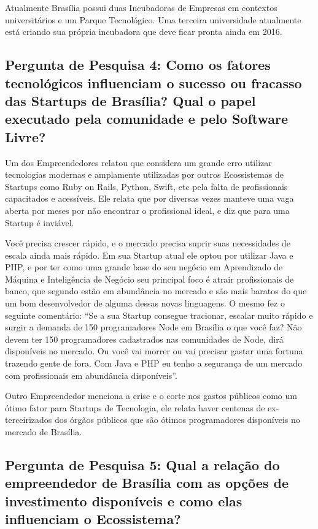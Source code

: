 Atualmente Brasília possui duas Incubadoras de Empresas em contextos universitários e um Parque Tecnológico. Uma terceira universidade atualmente está criando sua própria incubadora que deve ficar pronta ainda em 2016.

\subsection{Pergunta de Pesquisa 4: Como os fatores tecnológicos influenciam o sucesso ou fracasso das Startups de Brasília? Qual o papel executado pela comunidade e pelo Software Livre?}
\label{subsection:pergunta_de_pesquisa_4}

Um dos Empreendedores relatou que considera um grande erro utilizar tecnologias modernas e amplamente utilizadas por outros Ecossistemas de Startups como Ruby on Rails, Python, Swift, etc pela falta de profissionais capacitados e acessíveis. Ele relata que por diversas vezes manteve uma vaga aberta por meses por não encontrar o profissional ideal, e diz que para uma Startup é inviável. 

Você precisa crescer rápido, e o mercado precisa suprir suas necessidades de escala ainda mais rápido. Em sua Startup atual ele optou por utilizar Java e PHP, e por ter como uma grande base do seu negócio em Aprendizado de Máquina e Inteligência de Negócio seu principal foco é atrair profissionais de banco, que segundo estão em abundância no mercado e são mais baratos do que um bom desenvolvedor de alguma dessas novas linguagens. O mesmo fez o seguinte comentário: ``Se a sua Startup consegue tracionar, escalar muito rápido e surgir a demanda de 150 programadores Node em Brasília o que você faz? Não devem ter 150 programadores cadastrados nas comunidades de Node, dirá disponíveis no mercado. Ou você vai morrer ou vai precisar gastar uma fortuna trazendo gente de fora. Com Java e PHP eu tenho a segurança de um mercado com profissionais em abundância disponíveis''.

Outro Empreendedor menciona a crise e o corte nos gastos públicos como um ótimo fator para Startups de Tecnologia, ele relata haver centenas de ex-terceirizados dos órgãos públicos que são ótimos programadores disponíveis no mercado de Brasília.

\subsection{Pergunta de Pesquisa 5: Qual a relação do empreendedor de Brasília com as opções de investimento disponíveis e como elas influenciam o Ecossistema?}
\label{subsection:pergunta_de_pesquisa_5}

